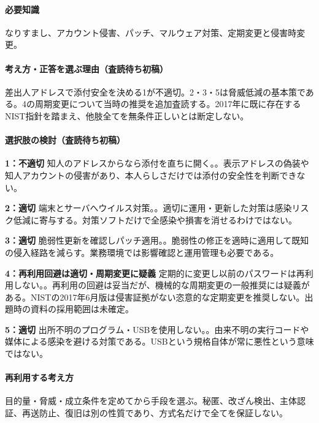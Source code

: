\paragraph{必要知識} なりすまし、アカウント侵害、パッチ、マルウェア対策、定期変更と侵害時変更。

\paragraph{考え方・正答を選ぶ理由（査読待ち初稿）} 差出人アドレスで添付安全を決める1が不適切。2・3・5は脅威低減の基本策である。4の周期変更について当時の推奨を追加査読する。2017年に既に存在するNIST指針を踏まえ、他肢全てを無条件正しいとは断定しない。

\paragraph{選択肢の検討（査読待ち初稿）}\mbox{}\par

\noindent\textbf{1：不適切} 知人のアドレスからなら添付を直ちに開く。。表示アドレスの偽装や知人アカウントの侵害があり、本人らしさだけでは添付の安全性を判断できない。\par

\noindent\textbf{2：適切} 端末とサーバへウイルス対策。。適切に運用・更新した対策は感染リスク低減に寄与する。対策ソフトだけで全感染や損害を消せるわけではない。\par

\noindent\textbf{3：適切} 脆弱性更新を確認しパッチ適用。。脆弱性の修正を適時に適用して既知の侵入経路を減らす。業務環境では影響確認と運用管理も必要である。\par

\noindent\textbf{4：再利用回避は適切・周期変更に疑義} 定期的に変更し以前のパスワードは再利用しない。。再利用の回避は妥当だが、機械的な周期変更の一般推奨には疑義がある。NISTの2017年6月版は侵害証拠がない恣意的な定期変更を推奨しない。出題時の資料の採用範囲は未確定。\par

\noindent\textbf{5：適切} 出所不明のプログラム・USBを使用しない。。由来不明の実行コードや媒体による感染を避ける対策である。USBという規格自体が常に悪性という意味ではない。\par

\paragraph{再利用する考え方} 目的量・脅威・成立条件を定めてから手段を選ぶ。秘匿、改ざん検出、主体認証、再送防止、復旧は別の性質であり、方式名だけで全てを保証しない。

